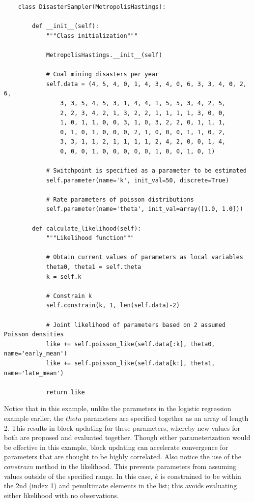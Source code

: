 \documentclass[]{book}
\begin{document}
\begin{verbatim}
    class DisasterSampler(MetropolisHastings):

        def __init__(self):
            """Class initialization"""

            MetropolisHastings.__init__(self)

            # Coal mining disasters per year
            self.data = (4, 5, 4, 0, 1, 4, 3, 4, 0, 6, 3, 3, 4, 0, 2, 6,
                3, 3, 5, 4, 5, 3, 1, 4, 4, 1, 5, 5, 3, 4, 2, 5,
                2, 2, 3, 4, 2, 1, 3, 2, 2, 1, 1, 1, 1, 3, 0, 0,
                1, 0, 1, 1, 0, 0, 3, 1, 0, 3, 2, 2, 0, 1, 1, 1,
                0, 1, 0, 1, 0, 0, 0, 2, 1, 0, 0, 0, 1, 1, 0, 2,
                3, 3, 1, 1, 2, 1, 1, 1, 1, 2, 4, 2, 0, 0, 1, 4,
                0, 0, 0, 1, 0, 0, 0, 0, 0, 1, 0, 0, 1, 0, 1)

            # Switchpoint is specified as a parameter to be estimated
            self.parameter(name='k', init_val=50, discrete=True)

            # Rate parameters of poisson distributions
            self.parameter(name='theta', init_val=array([1.0, 1.0]))

        def calculate_likelihood(self):
            """Likelihood function"""

            # Obtain current values of parameters as local variables
            theta0, theta1 = self.theta
            k = self.k

            # Constrain k
            self.constrain(k, 1, len(self.data)-2)

            # Joint likelihood of parameters based on 2 assumed Poisson densities
            like += self.poisson_like(self.data[:k], theta0, name='early_mean')
            like += self.poisson_like(self.data[k:], theta1, name='late_mean')

            return like
\end{verbatim}
Notice that in this example, unlike the parameters in the logistic regression example earlier, the $theta$ parameters are specified together as an array of length 2. This results in block updating for these parameters, whereby new values for both are proposed and evaluated together. Though either parameterization would be effective in this example, block updating can accelerate convergence for parameters that are thought to be highly correlated. Also notice the use of the $constrain$ method in the likelihood. This prevents parameters from assuming values outside of the specified range. In this case, $k$ is constrained to be within the 2nd (index 1) and penultimate elements in the list; this avoids evaluating either likelihood with no observations.
\end{document}
